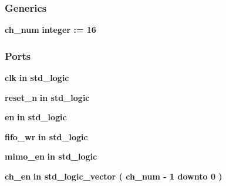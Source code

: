 \subsubsection*{Generics}
 \begin{DoxyCompactItemize}
\item 
{\bf ch\+\_\+num} {\bfseries {\bfseries \textcolor{comment}{integer}\textcolor{vhdlchar}{ }\textcolor{vhdlchar}{ }\textcolor{vhdlchar}{\+:}\textcolor{vhdlchar}{=}\textcolor{vhdlchar}{ }\textcolor{vhdlchar}{ } \textcolor{vhdldigit}{16} \textcolor{vhdlchar}{ }}}
\end{DoxyCompactItemize}
\subsubsection*{Ports}
 \begin{DoxyCompactItemize}
\item 
{\bf clk}  {\bfseries {\bfseries \textcolor{keywordflow}{in}\textcolor{vhdlchar}{ }}} {\bfseries \textcolor{comment}{std\+\_\+logic}\textcolor{vhdlchar}{ }} 
\item 
{\bf reset\+\_\+n}  {\bfseries {\bfseries \textcolor{keywordflow}{in}\textcolor{vhdlchar}{ }}} {\bfseries \textcolor{comment}{std\+\_\+logic}\textcolor{vhdlchar}{ }} 
\item 
{\bf en}  {\bfseries {\bfseries \textcolor{keywordflow}{in}\textcolor{vhdlchar}{ }}} {\bfseries \textcolor{comment}{std\+\_\+logic}\textcolor{vhdlchar}{ }} 
\item 
{\bf fifo\+\_\+wr}  {\bfseries {\bfseries \textcolor{keywordflow}{in}\textcolor{vhdlchar}{ }}} {\bfseries \textcolor{comment}{std\+\_\+logic}\textcolor{vhdlchar}{ }} 
\item 
{\bf mimo\+\_\+en}  {\bfseries {\bfseries \textcolor{keywordflow}{in}\textcolor{vhdlchar}{ }}} {\bfseries \textcolor{comment}{std\+\_\+logic}\textcolor{vhdlchar}{ }} 
\item 
{\bf ch\+\_\+en}  {\bfseries {\bfseries \textcolor{keywordflow}{in}\textcolor{vhdlchar}{ }}} {\bfseries \textcolor{comment}{std\+\_\+logic\+\_\+vector}\textcolor{vhdlchar}{ }\textcolor{vhdlchar}{(}\textcolor{vhdlchar}{ }\textcolor{vhdlchar}{ }\textcolor{vhdlchar}{ }\textcolor{vhdlchar}{ }{\bfseries {\bf ch\+\_\+num}} \textcolor{vhdlchar}{-\/}\textcolor{vhdlchar}{ } \textcolor{vhdldigit}{1} \textcolor{vhdlchar}{ }\textcolor{keywordflow}{downto}\textcolor{vhdlchar}{ }\textcolor{vhdlchar}{ } \textcolor{vhdldigit}{0} \textcolor{vhdlchar}{ }\textcolor{vhdlchar}{)}\textcolor{vhdlchar}{ }} 
\item 

\end{DoxyCompactItemize}
